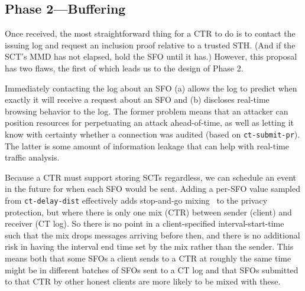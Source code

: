 \subsection{Phase 2---Buffering} \label{sec:base:phase2}

Once received, the most straightforward thing for a CTR to do is to contact the
issuing log and request an inclusion proof relative to a trusted STH\@. (And if
the SCT's MMD has not elapsed, hold the SFO until it has.) However, this
proposal has two flaws, the first of which leads us to the design of Phase 2.

Immediately contacting the log about an SFO (a) allows the log to predict when
exactly it will receive a request about an SFO and (b) discloses real-time
browsing behavior to the log. The former problem means that an attacker can
position resources for perpetuating an attack ahead-of-time, as well as letting
it know with certainty whether a connection was audited (based on
\texttt{ct-submit-pr}). The latter is some amount of information leakage that
can help with real-time traffic analysis. 

Because a CTR must support storing SCTs regardless, we can schedule an event in
the future for when each SFO would be sent. Adding a per-SFO value sampled from
\texttt{ct-delay-dist} effectively adds stop-and-go
mixing~\cite{kesdogan:ih1998} to the privacy protection, but where there is only
one mix (CTR) between sender (client) and receiver (CT log). So there is no
point in a client-specified interval-start-time such that the mix drops messages
arriving before then, and there is no additional risk in having the interval end
time set by the mix rather than the sender. This means both that some SFOs a
client sends to a CTR at roughly the same time might be in different batches of
SFOs sent to a CT log and that SFOs submitted to that CTR by other honest
clients are more likely to be mixed with these.


